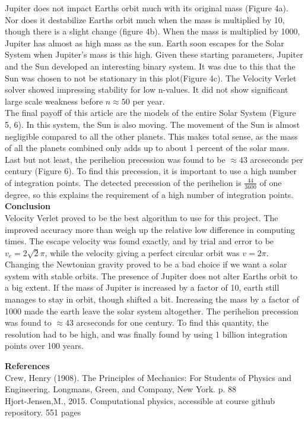 \documentclass[10pt,a4paper]{article}
\begin{document}
\noindent Jupiter does not impact Earths orbit much with its original mass (Figure 4a). Nor does it destabilize Earths orbit much when the mass is multiplied by 10, though there is a slight change (figure 4b). When the mass is multiplied by 1000, Jupiter has almost as high mass as the sun. Earth soon escapes for the Solar System when Jupiter's mass is this high. Given these starting parameters, Jupiter and the Sun developed an interesting binary system. It was due to this that the Sun was chosen to not be stationary in this plot(Figure 4c). The Velocity Verlet solver showed impressing stability for low n-values. It did not show significant large scale weakness before $n\approx 50$ per year.\\

\noindent The final payoff of this article are the models of the entire Solar System (Figure 5, 6). In this system, the Sun is also moving. The movement of the Sun is almost negligible compared to all the other planets. This makes total sense, as the mass of all the planets combined only adds up to about 1 percent of the solar mass.\\ 

\noindent Last but not least, the perihelion precession was found to be $\approx 43$ arcseconds per century (Figure 6). To find this precession, it is important to use a high number of integration points. The detected precession of the perihelion is $\frac{44}{3600}$ of one degree, so this explains the requirement of a high number of integration points. \\






\newpage
{\LARGE\bf
Conclusion
}\\

\noindent Velocity Verlet proved to be the best algorithm to use for this project. The improved accuracy more than weigh up the relative low difference in computing times. The escape velocity was found exactly, and by trial and error to be $v_e = 2\sqrt{2}\pi$, while the velocity giving a perfect circular orbit was $v=2\pi$. Changing the Newtonian gravity proved to be a bad choice if we want a solar system with stable orbits. The presence of Jupiter does not alter Earths orbit to a big extent. If the mass of Jupiter is increased by a factor of 10, earth still manages to stay in orbit, though shifted a bit. Increasing the mass by a factor of 1000 made the earth leave the solar system altogether. The perihelion precession was found to $\approx 43$ arcseconds for one century. To find this quantity, the resolution had to be high, and was finally found by using 1 billion integration points over 100 years. 








\newpage
{\LARGE\bf
References
}\\
Crew, Henry (1908). The Principles of Mechanics: For Students of Physics and Engineering. Longmans, Green, and Company, New York. p. 88\\

\noindent Hjort-Jensen,M., 2015. Computational physics, accessible at course github
repository. 551 pages
\end{document}
